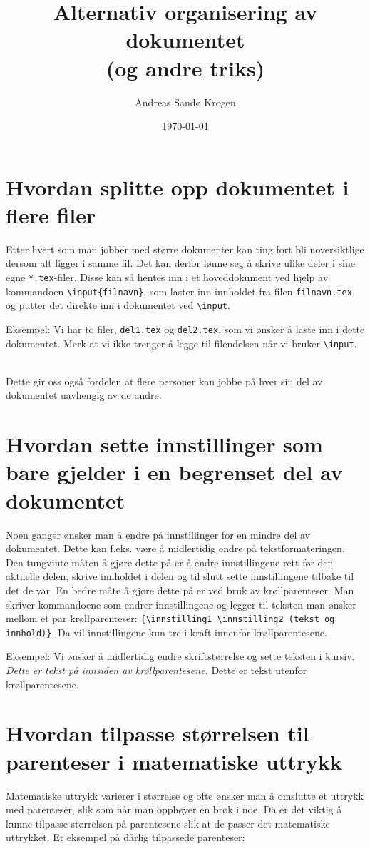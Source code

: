 \documentclass[a4paper, 11pt]{article}
\author{Andreas Sandø Krogen}
\date{\today}
\title{Alternativ organisering av dokumentet\\(og andre triks)}
\begin{document}
\maketitle
\section*{Hvordan splitte opp dokumentet i flere filer}
Etter hvert som man jobber med større dokumenter kan ting fort bli uoversiktlige dersom
alt ligger i samme fil. Det kan derfor lønne seg å skrive ulike deler i sine egne \texttt{*.tex}-filer. Disse kan så hentes inn i et hoveddokument ved hjelp av kommandoen \texttt{\textbackslash input\{filnavn\}}, som laster inn innholdet fra filen
\texttt{filnavn.tex} og putter det direkte inn i dokumentet ved \texttt{\textbackslash input}.

Eksempel: Vi har to filer, \texttt{del1.tex} og \texttt{del2.tex}, som vi ønsker å laste inn i dette dokumentet. Merk at vi ikke trenger å legge til filendelsen når vi bruker \texttt{\textbackslash input}.




~\\
Dette gir oss også fordelen at flere personer kan jobbe på hver sin del av dokumentet uavhengig av de andre.

\section*{Hvordan sette innstillinger som bare gjelder i en begrenset del av dokumentet}
Noen ganger ønsker man å endre på innstillinger for en mindre del av dokumentet. Dette kan f.eks. være å midlertidig endre på tekstformateringen. Den tungvinte måten å gjøre dette på er å endre innstillingene rett før den aktuelle delen, skrive innholdet i delen og til slutt sette innstillingene tilbake til det de var. En bedre måte å gjøre dette på er ved bruk av krøllparenteser. Man skriver kommandoene som endrer innstillingene og legger til teksten man ønsker mellom et par krøllparenteser: \texttt{\{\textbackslash innstilling1 \textbackslash innstilling2 (tekst og innhold)\}}. Da vil innstillingene kun tre i kraft innenfor krøllparentesene.

Eksempel: Vi ønsker å midlertidig endre skriftstørrelse og sette teksten i kursiv.
{\Large \it Dette er tekst på innsiden av krøllparentesene.}
Dette er tekst utenfor krøllparentesene.

\section*{Hvordan tilpasse størrelsen til parenteser i matematiske uttrykk}
Matematiske uttrykk varierer i størrelse og ofte ønsker man å omslutte et uttrykk med parenteser, slik som når man opphøyer en brøk i noe. Da er det viktig å kunne tilpasse størrelsen på parentesene slik at de passer det matematiske uttrykket.
Et eksempel på dårlig tilpassede parenteser:
\end{document}
